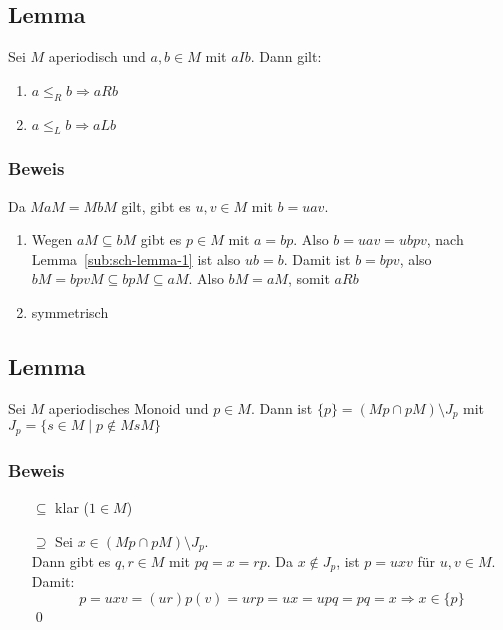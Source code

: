     \subsection{Lemma}
        \label{sub:sch-lemma-2}
        Sei $M$ aperiodisch und $a,b\in M$ mit $aIb$. Dann gilt:
        \begin{enumerate}
            \item $a\le_R b\Rightarrow aRb$
            \item $a\le_L b\Rightarrow aLb$
        \end{enumerate}
        \subsubsection{Beweis}
            Da $MaM=MbM$ gilt, gibt es $u,v\in M$ mit $b=uav$.
            \begin{enumerate}
                \item Wegen $aM\subseteq bM$ gibt es $p\in M$ mit $a=bp$. Also $b=uav=ubpv$, nach Lemma~\ref{sub:sch-lemma-1} ist also $ub=b$.
                Damit ist $b=bpv$, also $bM=bpvM\subseteq bpM\subseteq aM$. Also $bM=aM$, somit $aRb$
                \item symmetrisch
            \end{enumerate}
    \subsection{Lemma}
        \label{sub:sch-lemma-3}
        Sei $M$ aperiodisches Monoid und $p\in M$. Dann ist $\{p\}=(Mp\cap pM)\setminus J_p$ mit $J_p=\{s\in M\mid p\not\in MsM\}$
        \subsubsection{Beweis}
            \begin{itemize}
                \item[$\subseteq$] klar ($1\in M$)
                \item[$\supseteq$] Sei $x\in (Mp\cap pM)\setminus J_p$.\\
                Dann gibt es $q,r\in M$ mit $pq=x=rp$. Da $x\notin J_p$, ist $p=uxv$ für $u,v\in M$.\\
                Damit: $$p=uxv=(ur)p(v)=urp=ux=upq=pq=x\Rightarrow x\in\{p\}$$\qed
            \end{itemize}
